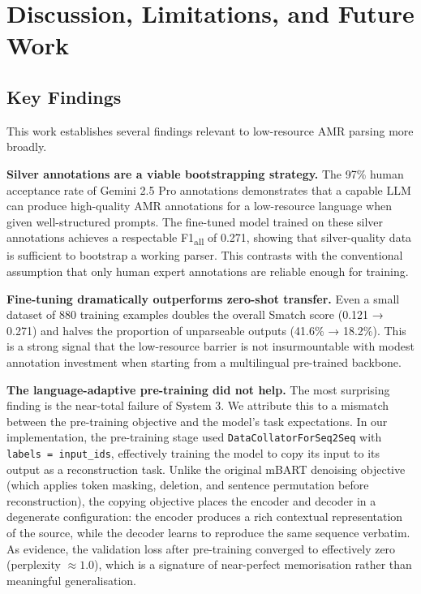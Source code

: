 \section{Discussion, Limitations, and Future Work}
\label{sec:discussion}

\subsection{Key Findings}

This work establishes several findings relevant to low-resource AMR parsing more broadly.

\textbf{Silver annotations are a viable bootstrapping strategy.} The 97\% human acceptance rate of Gemini 2.5 Pro annotations demonstrates that a capable LLM can produce high-quality AMR annotations for a low-resource language when given well-structured prompts. The fine-tuned model trained on these silver annotations achieves a respectable F1\textsubscript{all} of 0.271, showing that silver-quality data is sufficient to bootstrap a working parser. This contrasts with the conventional assumption that only human expert annotations are reliable enough for training.

\textbf{Fine-tuning dramatically outperforms zero-shot transfer.} Even a small dataset of 880 training examples doubles the overall Smatch score (0.121 → 0.271) and halves the proportion of unparseable outputs (41.6\% → 18.2\%). This is a strong signal that the low-resource barrier is not insurmountable with modest annotation investment when starting from a multilingual pre-trained backbone.

\textbf{The language-adaptive pre-training did not help.} The most surprising finding is the near-total failure of System 3. We attribute this to a mismatch between the pre-training objective and the model's task expectations. In our implementation, the pre-training stage used \texttt{DataCollatorForSeq2Seq} with \texttt{labels = input\_ids}, effectively training the model to copy its input to its output as a reconstruction task. Unlike the original mBART denoising objective (which applies token masking, deletion, and sentence permutation before reconstruction), the copying objective places the encoder and decoder in a degenerate configuration: the encoder produces a rich contextual representation of the source, while the decoder learns to reproduce the same sequence verbatim. As evidence, the validation loss after pre-training converged to effectively zero (perplexity $\approx 1.0$), which is a signature of near-perfect memorisation rather than meaningful generalisation.

